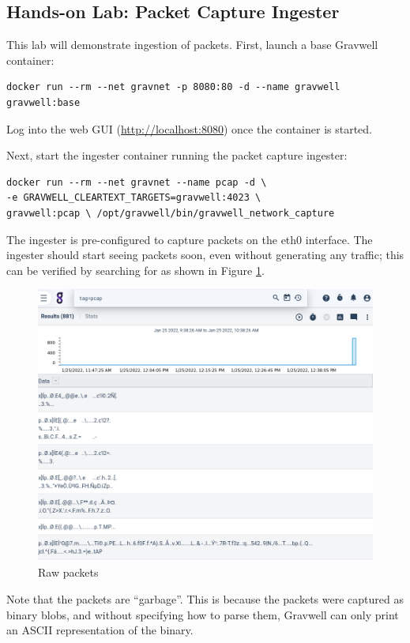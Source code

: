 \subsection{Hands-on Lab: Packet Capture Ingester}

This lab will demonstrate ingestion of packets. First, launch a base
Gravwell container:

\begin{Verbatim}[breaklines=true]
docker run --rm --net gravnet -p 8080:80 -d --name gravwell gravwell:base
\end{Verbatim}

Log into the web GUI (\href{http://localhost:8080}{http://localhost:8080}) once the container is started.

Next, start the ingester container running the packet capture
ingester:

\begin{Verbatim}[breaklines=true]
docker run --rm --net gravnet --name pcap -d \
-e GRAVWELL_CLEARTEXT_TARGETS=gravwell:4023 \
gravwell:pcap \ /opt/gravwell/bin/gravwell_network_capture
\end{Verbatim}


The ingester is pre-configured to capture packets on the eth0
interface. The ingester should start seeing packets soon, even without
generating any traffic; this can be verified by searching for
\code{tag=pcap} as shown in Figure \ref{fig:pcap-lab1}.

\begin{figure}
	\includegraphics[width=0.8\linewidth]{images/igst-pcap-lab1.png}
	\caption{Raw packets}
	\label{fig:pcap-lab1}
\end{figure}

Note that the packets are ``garbage''. This is because the packets were
captured as binary blobs, and without specifying how to parse them,
Gravwell can only print an ASCII representation of the binary.

